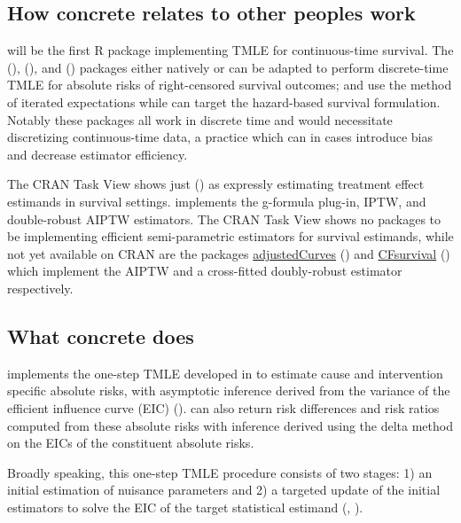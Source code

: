 \documentclass{report}
\newcommand{\1}{\ensuremath{\mathbf{1}}}
\begin{document}
\subsection{How concrete relates to other peoples work}
\label{sec:org6590b21}
 will be the first R package implementing TMLE for continuous-time survival. The  (\cite{schwab_ltmle_2020}),  (\cite{sofrygin_stremr_2017}), and  (\cite{benkeser_survtmle_2019}) packages either natively or can be adapted to perform discrete-time TMLE for absolute risks of right-censored survival outcomes;  and  use the method of iterated expectations while  can target the hazard-based survival formulation. Notably these packages all work in discrete time and would necessitate discretizing continuous-time data, a practice which can in cases introduce bias and decrease estimator efficiency. 

The  CRAN Task View shows just  (\cite{gerds_riskregression_2022}) as expressly estimating treatment effect estimands in survival settings.  implements the g-formula plug-in, IPTW, and double-robust AIPTW estimators. The  CRAN Task View shows no packages to be implementing efficient semi-parametric estimators for survival estimands, while not yet available on CRAN are the packages \href{https://github.com/RobinDenz1/adjustedCurves}{adjustedCurves} (\cite{denz_comparison_2022}) and \href{https://github.com/tedwestling/CFsurvival}{CFsurvival} (\cite{westling_inference_2021}) which implement the AIPTW and a cross-fitted doubly-robust estimator respectively. 

\subsection{What concrete does}
\label{sec:orgfa68819}
 implements the one-step TMLE developed in \cite{rytgaard_one-step_2021} to estimate cause and intervention specific absolute risks, with asymptotic inference derived from the variance of the efficient influence curve (EIC) (\cite{laan_unified_2003-1}).  can also return risk differences and risk ratios computed from these absolute risks with inference derived using the delta method on the EICs of the constituent absolute risks.

Broadly speaking, this one-step TMLE procedure consists of two stages: 1) an initial estimation of nuisance parameters and 2) a targeted update of the initial estimators to solve the EIC of the target statistical estimand (\cite{laan_unified_2003-1}, \cite{kennedy_semiparametric_2016}).
\end{document}
